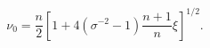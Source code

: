 \begin{equation}\label{nu0}
  \nu _0=\frac{n}{2}\left[ 1+4(\sigma ^{-2}-1)
  \frac{n+1}{n}\xi  \right] ^{1/2 }.
\end{equation}

